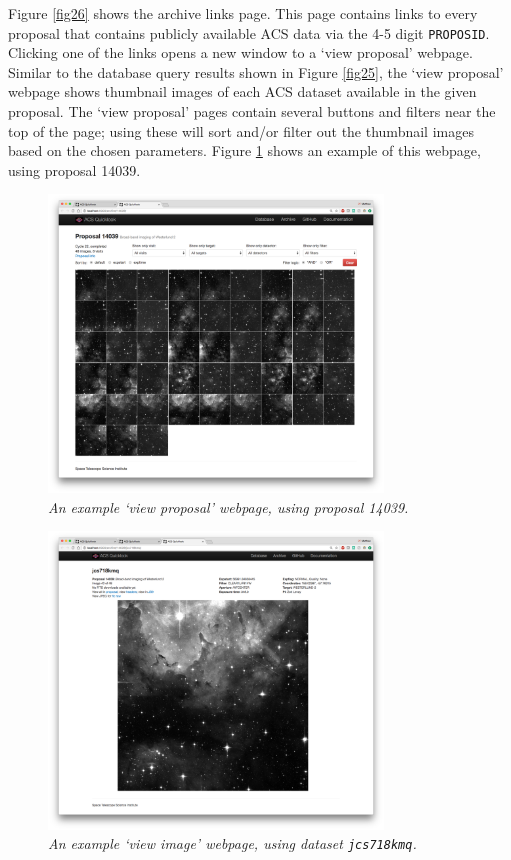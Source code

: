 \documentclass[10pt,journal,compsoc]{IEEEtran}
\begin{document}
Figure \ref{fig26} shows the archive links page.  This page contains links to every proposal that contains publicly available ACS data via the 4-5 digit \texttt{PROPOSID}.  Clicking one
of the links opens a new window to a `view proposal' webpage.  Similar to the database query results shown in Figure \ref{fig25}, the `view proposal' webpage shows
thumbnail images of each ACS dataset available in the given proposal.  The `view proposal' pages contain several buttons and filters near the top of the page; using these will sort and/or
filter out the thumbnail images based on the chosen parameters.  Figure \ref{fig27} shows an example of this webpage, using proposal 14039.

\begin{figure}[!t]
\centering
\includegraphics[width=3.5in]{./figures/view_proposal.png}
\caption{\textit{An example `view proposal' webpage, using proposal 14039.}}
\label{fig27}
\end{figure}

\begin{figure}[!t]
\centering
\includegraphics[width=3.5in]{./figures/view_image.png}
\caption{\textit{An example `view image' webpage, using dataset \texttt{jcs718kmq}.}}
\label{fig28}
\end{figure}
\end{document}
